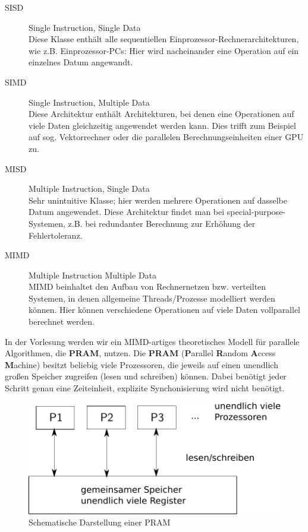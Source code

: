 \begin{description}
\item[SISD] Single Instruction, Single  Data \\
Diese Klasse enthält alle sequentiellen Einprozessor-Rechnerarchitekturen, wie z.B. Einprozessor-PCs: Hier wird nacheinander eine Operation auf ein einzelnes Datum angewandt.
\item[SIMD] Single Instruction, Multiple Data \\
Diese Architektur enthält Architekturen, bei denen eine Operationen auf viele Daten gleichzeitig angewendet werden kann. Dies trifft zum Beispiel auf sog. Vektorrechner oder die parallelen Berechnungseinheiten einer GPU zu.
\item[MISD] Multiple Instruction, Single Data \\
Sehr unintuitive Klasse; hier werden mehrere Operationen auf dasselbe Datum angewendet. Diese Architektur findet man bei special-purpose-Systemen, z.B. bei redundanter Berechnung zur Erhöhung der Fehlertoleranz.
\item[MIMD] Multiple Instruction Multiple Data \\
MIMD beinhaltet den Aufbau von Rechnernetzen bzw. verteilten Systemen, in denen allgemeine Threads/Prozesse modelliert werden können. Hier können verschiedene Operationen auf viele Daten vollparallel berechnet werden.
\end{description}

In der Vorlesung werden wir ein MIMD-artiges theoretisches Modell für parallele Algorithmen, die \textbf{PRAM}, nutzen. Die \textbf{PRAM} (\textbf{P}arallel \textbf{R}andom \textbf{A}ccess \textbf{M}achine) besitzt beliebig viele Prozessoren, die jeweils auf einen unendlich großen Speicher zugreifen (lesen und schreiben) können. Dabei benötigt jeder Schritt genau eine Zeiteinheit, explizite Synchonisierung wird nicht benötigt.

\begin{figure}[h!]
\centering
\includegraphics[scale=0.6]{bilder/pram.pdf}
\caption{Schematische Darstellung einer PRAM}
\end{figure}

